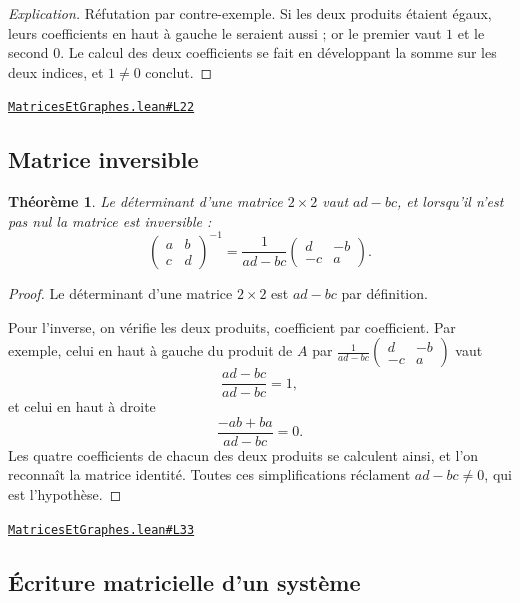 \documentclass[11pt,a4paper]{article}
\theoremstyle{definition}
\theoremstyle{plain}
\newtheorem{theoreme}{Théorème}
\newenvironment{explication}{\begin{proof}[Explication]}{\end{proof}}
\newcommand{\source}[2]{\par\smallskip\noindent\hfill{\footnotesize\href{#1}{\texttt{#2}}}\par\smallskip}
\begin{document}
\begin{explication}
Réfutation par contre-exemple. Si les deux produits étaient égaux, leurs coefficients en
haut à gauche le seraient aussi ; or le premier vaut $1$ et le second $0$. Le calcul des
deux coefficients se fait en développant la somme sur les deux indices, et
$1 \ne 0$ conclut.
\end{explication}
\source{https://github.com/Commutator-IO/learn-lean/blob/main/courses/02-lycee/10-specialite-mathematiques-terminale-s/MatricesEtGraphes.lean\#L22}{MatricesEtGraphes.lean\#L22}

\subsection{Matrice inversible}

\begin{theoreme}
Le déterminant d'une matrice $2 \times 2$ vaut $ad - bc$, et lorsqu'il n'est pas nul la
matrice est inversible :
\[ \begin{pmatrix} a & b \\ c & d \end{pmatrix}^{-1}
   = \frac{1}{ad - bc}\begin{pmatrix} d & -b \\ -c & a \end{pmatrix} . \]
\end{theoreme}

\begin{proof}
Le déterminant d'une matrice $2 \times 2$ est $ad - bc$ par définition.

Pour l'inverse, on vérifie les deux produits, coefficient par coefficient. Par exemple,
celui en haut à gauche du produit de $A$ par
$\frac{1}{ad-bc}\begin{pmatrix} d & -b \\ -c & a\end{pmatrix}$ vaut
\[ \frac{ad - bc}{ad - bc} = 1 , \]
et celui en haut à droite
\[ \frac{-ab + ba}{ad - bc} = 0 . \]
Les quatre coefficients de chacun des deux produits se calculent ainsi, et l'on reconnaît
la matrice identité. Toutes ces simplifications réclament $ad - bc \ne 0$, qui est
l'hypothèse.
\end{proof}
\source{https://github.com/Commutator-IO/learn-lean/blob/main/courses/02-lycee/10-specialite-mathematiques-terminale-s/MatricesEtGraphes.lean\#L33}{MatricesEtGraphes.lean\#L33}

\subsection{Écriture matricielle d'un système}
\end{document}
